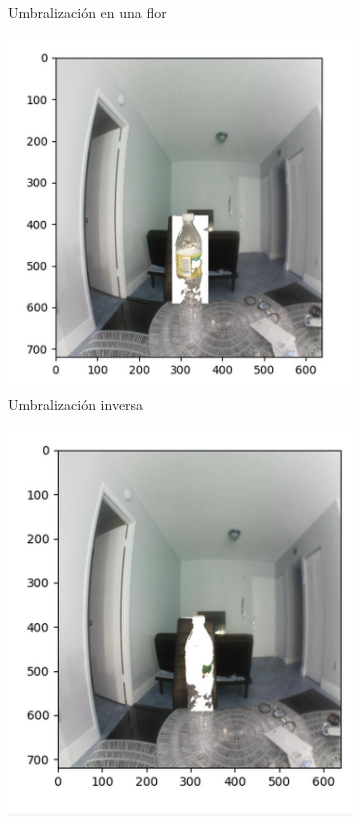 \begin{figure}[H]
\begin{subfigure}[b]{0.4\textwidth}
        \caption{Umbralización en una flor}
        \label{otsu_position}
     \end{subfigure}
     \hfill
     \begin{subfigure}[b]{0.4\textwidth}
        \centering
        \includegraphics[scale=0.35]{Recursos/umbral_inverso.jpg}
        \caption{Umbralización inversa}
        \label{otsu_inverso}
     \end{subfigure}
     \hfill
     \begin{subfigure}[b]{0.4\textwidth}
         \centering
        \includegraphics[scale=0.31]{Recursos/umbral_normal.jpg}

\end{subfigure}
\end{figure}
